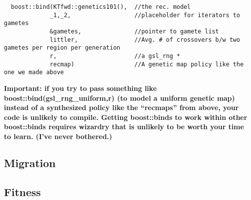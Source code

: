 \documentclass{article}
\begin{document}
\begin{lstlisting}
  boost::bind(KTfwd::genetics101(),  //the rec. model
             _1,_2,                  //placeholder for iterators to gametes
             &gametes,               //pointer to gamete list
             littler,                //Avg. # of crossovers b/w two gametes per region per generation
             r,                      //a gsl_rng *
             recmap)                 //A genetic map policy like the one we made above
\end{lstlisting}

\textbf{Important: if you try to pass something like boost::bind(gsl\_rng\_uniform,r) (to model a uniform genetic map) instead of a synthesized policy like the ``recmaps'' from above, your code is unlikely to compile.  Getting boost::binds to work within other boost::binds requires wizardry that is unlikely to be worth your time to learn.  (I've never bothered.)}
\subsection{Migration}
\subsection{Fitness}
\end{document}
